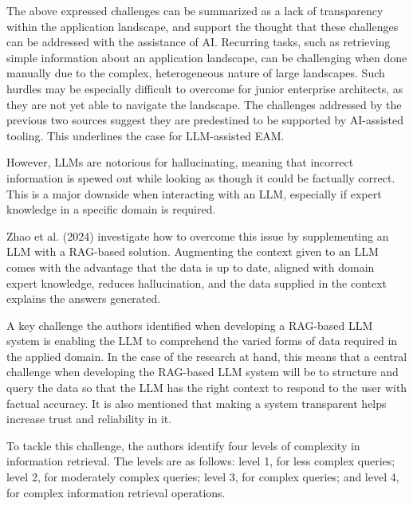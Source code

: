 The above expressed challenges can be summarized as a lack of transparency within the application landscape, and support the thought that these challenges can be addressed with the assistance of AI. Recurring tasks, such as retrieving simple information about an application landscape, can be challenging when done manually due to the complex, heterogeneous nature of large landscapes. Such hurdles may be especially difficult to overcome for junior enterprise architects, as they are not yet able to navigate the landscape. The challenges addressed by the previous two sources suggest they are predestined to be supported by AI-assisted tooling. This underlines the case for LLM-assisted EAM.

However, LLMs are notorious for hallucinating, meaning that incorrect information is spewed out while looking as though it could be factually correct. This is a major downside when interacting with an LLM, especially if expert knowledge in a specific domain is required.


Zhao et al. (2024) \cite{zhao2024retrieval} investigate how to overcome this issue by supplementing an LLM with a RAG-based solution. Augmenting the context given to an LLM comes with the advantage that the data is up to date, aligned with domain expert knowledge, reduces hallucination, and the data supplied in the context explains the answers generated.

A key challenge the authors identified when developing a RAG-based LLM system is enabling the LLM to comprehend the varied forms of data required in the applied domain. In the case of the research at hand, this means that a central challenge when developing the RAG-based LLM system will be to structure and query the data so that the LLM has the right context to respond to the user with factual accuracy. It is also mentioned that making a system transparent helps increase trust and reliability in it.

To tackle this challenge, the authors identify four levels of complexity in information retrieval. The levels are as follows: level 1, for less complex queries; level 2, for moderately complex queries; level 3, for complex queries; and level 4, for complex information retrieval operations. \cite{zhao2024retrieval}

